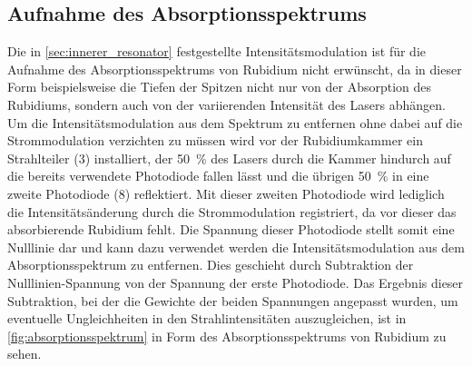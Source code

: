 
 

\subsection{Aufnahme des Absorptionsspektrums}

Die in \cref{sec:innerer_resonator} festgestellte Intensitätsmodulation ist für die 
Aufnahme des Absorptionsspektrums von Rubidium nicht erwünscht, da in dieser Form
beispielsweise die Tiefen der Spitzen nicht nur von der Absorption des Rubidiums,
sondern auch von der variierenden Intensität des Lasers abhängen. 
Um die Intensitätsmodulation aus dem Spektrum zu entfernen ohne dabei auf die
Strommodulation verzichten zu müssen wird vor der Rubidiumkammer ein Strahlteiler (3) 
installiert, der \SI{50}{\percent} des Lasers durch die Kammer hindurch auf die 
bereits verwendete Photodiode fallen lässt und die übrigen \SI{50}{\percent} in
eine zweite Photodiode (8) reflektiert. Mit dieser zweiten Photodiode wird lediglich
die Intensitätsänderung durch die Strommodulation registriert, da vor dieser das 
absorbierende Rubidium fehlt. Die Spannung dieser Photodiode stellt somit eine
Nulllinie dar und kann dazu verwendet werden die Intensitätsmodulation aus dem 
Absorptionsspektrum zu entfernen. Dies geschieht durch Subtraktion der Nulllinien-Spannung
von der Spannung der erste Photodiode. Das Ergebnis dieser Subtraktion, bei der 
die Gewichte der beiden Spannungen angepasst wurden, um eventuelle Ungleichheiten in den 
Strahlintensitäten auszugleichen, ist in \cref{fig:absorptionsspektrum} in Form des Absorptionsspektrums von 
Rubidium zu sehen.
  
  
  




 



